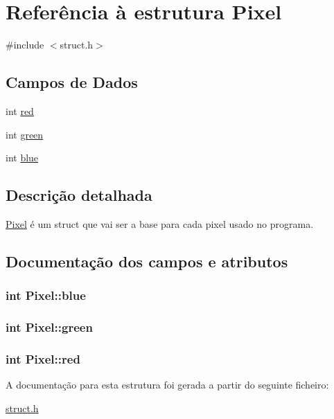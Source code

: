 \hypertarget{structPixel}{}\section{Referência à estrutura Pixel}
\label{structPixel}


{\ttfamily \#include $<$struct.\+h$>$}

\subsection*{Campos de Dados}
\begin{DoxyCompactItemize}
\item 
int \hyperlink{structPixel_a975b9929cee50eba61195c414b9b8420}{red}
\item 
int \hyperlink{structPixel_a729280ab013a63b569b063407239470f}{green}
\item 
int \hyperlink{structPixel_a2145c6cba3e6eb72cb21ed08695fc2f3}{blue}
\end{DoxyCompactItemize}


\subsection{Descrição detalhada}
\hyperlink{structPixel}{Pixel} é um struct que vai ser a base para cada pixel usado no programa. 

\subsection{Documentação dos campos e atributos}
\hypertarget{structPixel_a2145c6cba3e6eb72cb21ed08695fc2f3}{}
\subsubsection[{blue}]{\setlength{\rightskip}{0pt plus 5cm}int Pixel\+::blue}\label{structPixel_a2145c6cba3e6eb72cb21ed08695fc2f3}
\hypertarget{structPixel_a729280ab013a63b569b063407239470f}{}
\subsubsection[{green}]{\setlength{\rightskip}{0pt plus 5cm}int Pixel\+::green}\label{structPixel_a729280ab013a63b569b063407239470f}
\hypertarget{structPixel_a975b9929cee50eba61195c414b9b8420}{}
\subsubsection[{red}]{\setlength{\rightskip}{0pt plus 5cm}int Pixel\+::red}\label{structPixel_a975b9929cee50eba61195c414b9b8420}


A documentação para esta estrutura foi gerada a partir do seguinte ficheiro\+:\begin{DoxyCompactItemize}
\item 
\hyperlink{struct_8h}{struct.\+h}\end{DoxyCompactItemize}

